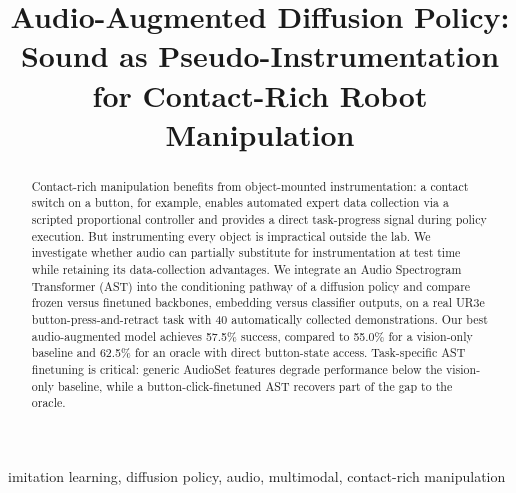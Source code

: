 \documentclass[conference]{IEEEtran}
\begin{document}
\title{Audio-Augmented Diffusion Policy: Sound as Pseudo-Instrumentation for Contact-Rich Robot Manipulation}

\author{
\and
{}
}

\maketitle

\begin{abstract}
Contact-rich manipulation benefits from object-mounted instrumentation: a contact switch on a button, for example, enables automated expert data collection via a scripted proportional controller and provides a direct task-progress signal during policy execution.
But instrumenting every object is impractical outside the lab.
We investigate whether audio can partially substitute for instrumentation at test time while retaining its data-collection advantages.
We integrate an Audio Spectrogram Transformer (AST) into the conditioning pathway of a diffusion policy and compare frozen versus finetuned backbones, embedding versus classifier outputs, on a real UR3e button-press-and-retract task with 40 automatically collected demonstrations.
Our best audio-augmented model achieves 57.5\% success, compared to 55.0\% for a vision-only baseline and 62.5\% for an oracle with direct button-state access.
Task-specific AST finetuning is critical: generic AudioSet features degrade performance below the vision-only baseline, while a button-click-finetuned AST recovers part of the gap to the oracle.
\end{abstract}

\begin{IEEEkeywords}
imitation learning, diffusion policy, audio, multimodal, contact-rich manipulation
\end{IEEEkeywords}

\end{document}
